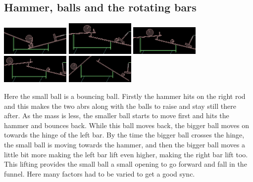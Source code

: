 \documentclass[11pt]{article}
\begin{document}
\subsection{Hammer, balls and the rotating bars}
\begin{center}
\includegraphics[width=0.25\textwidth,height=0.1\textheight]{img/hammer1} 
\hspace{2em}
\includegraphics[width=0.25\textwidth,height=0.1\textheight]{img/hammer2}
\hspace{2em}
\includegraphics[width=0.25\textwidth,height=0.1\textheight]{img/hammer3}
\hspace{2em}
\includegraphics[width=0.25\textwidth,height=0.1\textheight]{img/hammer4}
\hspace{2em}
\includegraphics[width=0.25\textwidth,height=0.1\textheight]{img/hammer5}
\end{center}
Here the small ball is a bouncing ball. Firstly the hammer hits on the right rod and this makes the two abrs along with the balls to raise and stay still there after. As the mass is less, the smaller ball starts to move first and hits the hammer and bounces back. While this ball moves back, the bigger ball moves on towards the hinge of the left bar. By the time the bigger ball crosses the hinge, the small ball is moving towards the hammer, and then the bigger ball moves a little bit more making the left bar lift even higher, making the right bar lift too. This lifting provides the small ball a small opening to go forward and fall in the funnel. Here many factors had to be varied to get a good sync.
\end{document}
